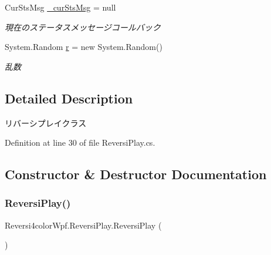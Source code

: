 \begin{DoxyCompactItemize}
\mbox{\label{class_reversi4color_wpf_1_1_reversi_play_a1b7c50bcc46c3930918ab30a5d671b46}} 
Cur\+Sts\+Msg \hyperlink{class_reversi4color_wpf_1_1_reversi_play_a1b7c50bcc46c3930918ab30a5d671b46}{\+\_\+cur\+Sts\+Msg} = null
\begin{DoxyCompactList}\small\item\em 現在のステータスメッセージコールバック \end{DoxyCompactList}\item 
\mbox{\label{class_reversi4color_wpf_1_1_reversi_play_a3875f35474a80463cd4ca05cc5bc792e}} 
System.\+Random \hyperlink{class_reversi4color_wpf_1_1_reversi_play_a3875f35474a80463cd4ca05cc5bc792e}{r} = new System.\+Random()
\begin{DoxyCompactList}\small\item\em 乱数 \end{DoxyCompactList}\end{DoxyCompactItemize}


\subsection{Detailed Description}
リバーシプレイクラス 

Definition at line 30 of file Reversi\+Play.\+cs.



\subsection{Constructor \& Destructor Documentation}
\mbox{\label{class_reversi4color_wpf_1_1_reversi_play_aa537cfa5793632608337be296a859474}} 
\subsubsection{\texorpdfstring{Reversi\+Play()}{ReversiPlay()}}
{\footnotesize\ttfamily Reversi4color\+Wpf.\+Reversi\+Play.\+Reversi\+Play (\begin{DoxyParamCaption}{ }\end{DoxyParamCaption})}




